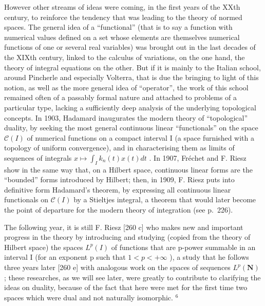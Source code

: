 However other streams of ideas were coming, in the first years of the XXth century, to reinforce the tendency that was leading to the theory of normed spaces. The general idea of a ``functional'' (that is to say a function with numerical values defined on a set whose elements are themselves numerical functions of one or several real variables) was brought out in the last decades of the XIXth century, linked to the calculus of variations, on the one hand, the theory of integral equations on the other. But if it is mainly to the Italian school, around Pincherle and especially Volterra, that is due the bringing to light of this notion, as well as the more general idea of ``operator'', the work of this school remained often of a passably formal nature and attached to problems of a particular type, lacking a sufficiently deep analysis of the underlying topological concepts. In 1903, Hadamard inaugurates the modern theory of ``topological'' duality, by seeking the most general continuous linear ``functionals'' on the space \(\mathcal{C}(I)\) of numerical functions on a compact interval I (a space furnished with a topology of uniform convergence), and in characterising them as limits of sequences of integrals \(x \mapsto \int_{I} k_{n}(t)x(t)dt\) . In 1907, Fréchet and F. Riesz show in the same way that, on a Hilbert space, continuous linear forms are the ``bounded'' forms introduced by Hilbert; then, in 1909, F. Riesz puts into definitive form Hadamard's theorem, by expressing all continuous linear functionals on \(\mathcal{C}(I)\) by a Stieltjes integral, a theorem that would later become the point of departure for the modern theory of integration (see p.~226).

The following year, it is still F. Riesz {[}260 c{]} who makes new and important progress in the theory by introducing and studying (copied from the theory of Hilbert space) the spaces \(L^{p}(I)\) of functions that are p-power summable in an interval I (for an exponent p such that \(1 < p < +\infty\) ), a study that he follows three years later {[}260 e{]} with analogous work on the spaces of sequences \(L^{p}(\mathbf{N})\) ; these researches, as we will see later, were greatly to contribute to clarifying the ideas on duality, because of the fact that here were met for the first time two spaces which were dual and not naturally isomorphic. \(^{6}\)


